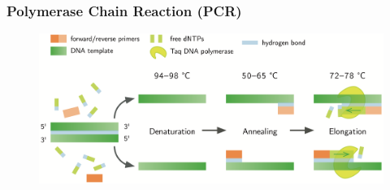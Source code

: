 \documentclass[xcolor=dvipsnames,envcountsect]{beamer}
\begin{document}

\begin{frame}
	\frametitle{Polymerase Chain Reaction (PCR)}
	\begin{figure}
	    \includegraphics[scale=.7]{PCR}
	\end{figure}
\end{frame}


\end{document}
